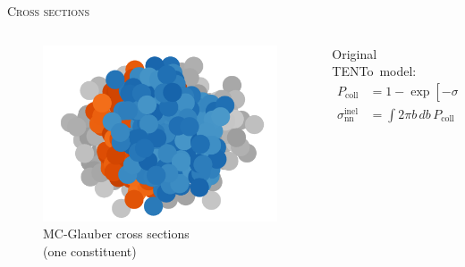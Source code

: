 \documentclass[aspectratio=169]{beamer}
\newcommand{\trento}{T\raisebox{-0.3ex}{R}ENTo}
\begin{document}
\begin{frame}[t]{\scshape Cross sections}
  \begin{columns}[T]
    \begin{column}{.5\textwidth}
      \begin{figure}
        \includegraphics[width=\textwidth]{trento_participants}\\
        \small MC-Glauber cross sections\\
        (one constituent)
      \end{figure}
    \end{column}
    \begin{column}{.5\textwidth}
      \centering \bigskip
      \textcolor{theme}{Original \trento\ model:}
      \begin{align*}
        P_\text{coll} &= 1 - \exp[-\sigma_\text{eff} T_\text{pp}(b)] \\
        \sigma_\text{nn}^\text{inel} &= \int 2\pi b\, db\, P_\text{coll}(b)
      \end{align*}
    \end{column}
  \end{columns}
\end{frame}
\end{document}
